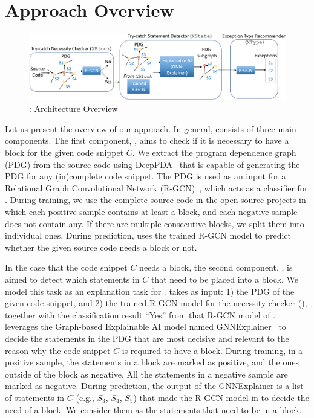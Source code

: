 \section{Approach Overview}
\label{sec:overview}

\begin{figure}[t]
\begin{center}
\includegraphics[width=5.4in]{overview-2.png}
\vspace{-10pt}
\caption{{\tool}: Architecture Overview}
\label{overview}
\end{center}
\end{figure}

Let us present the overview of our approach. In general, {\tool}
consists of three main components. The first component, {\xblock},
aims to check if it is necessary to have a  block for
the given code snippet $C$. We extract the program dependence graph
(PDG) from the source code using DeepPDA~\cite{icse23} that is capable
of generating the PDG for any (in)complete code snippet. The PDG is
used as an input for a Relational Graph Convolutional Network
(R-GCN)~\cite{yi}, which acts as a classifier for {\xblock}. During
training, we use the complete source code in the open-source projects
in which each positive sample contains at least a 
block, and each negative sample does not contain any. If there are
multiple consecutive blocks, we split them into individual
ones. During prediction, {\xblock} uses the trained R-GCN model to predict
whether the given source code needs a  block or not.

In the case that the code snippet $C$ needs a  block,
the second component, {\xstate}, is aimed to detect which statements
in $C$ that need to be placed into a  block.  We model
this task as an explanation task for {\xblock}. {\xstate} takes as
input: 1) the PDG of the given code snippet, and 2) the trained R-GCN
model for the  necessity checker ({\xblock}), together
with the classification result ``Yes'' from that R-GCN model of
{\xblock}. {\xstate} leverages the Graph-based Explainable AI model
named GNNExplainer~\cite{GNNExplainer} to decide the statements in the
PDG that are most decisive and relevant to the reason why the code snippet
$C$ is required to have a  block. During training, in
a positive sample, the statements in a  block are
marked as positive, and the ones outside of the block as negative. All
the statements in a negative sample are marked as negative. During
prediction, the output of the GNNExplainer is a list of statements in
$C$ (e.g., $S_3$, $S_4$, $S_5$) that made the R-GCN model in {\xblock}
to decide the need of a  block. We consider them as
the statements that need to be in a  block.

